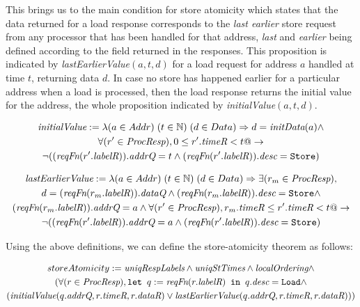This brings us to the main condition for store atomicity which states that the
data returned for a load response corresponds to the \emph{last earlier} store
request from any processor that has been handled for that address,
\emph{last} and \emph{earlier} being defined according to the field \timeR{}
returned in the responses.  This proposition is indicated by
\textit{lastEarlierValue}$(a, t, d)$ for a load request for address $a$ handled
at time $t$, returning data $d$.  In case no store has happened earlier for a
particular address when a load is processed, then the load response returns the
initial value for the address, the whole proposition indicated by
\textit{initialValue}$(a, t, d)$.
\begin{defn}
\small
\begin{multline*}
\textit{initialValue} := \lambda (a \in Addr)\; (t \in \mathbb{N}) \; (d \in Data)\Rightarrow
d = \textit{initData} (a) \wedge \\
\forall (r' \in \textit{ProcResp}), 0 \le r'.\textit{timeR} < t @->\\
\neg ((\textit{reqFn} (r'.\textit{labelR})).\textit{addrQ} = t \wedge (\textit{reqFn} (r'.\textit{labelR})).\textit{desc} = \texttt{Store})
\end{multline*}
\end{defn}

\begin{defn}
\small
\begin{multline*}
\textit{lastEarlierValue} := \lambda (a \in Addr)\; (t \in \mathbb{N}) \; (d \in Data)\Rightarrow
\exists (r_m \in \textit{ProcResp}),\\ d = (\textit{reqFn} (r_m.\textit{labelR})).\textit{dataQ} \wedge 
(\textit{reqFn} (r_m.\textit{labelR})).\textit{desc} = \texttt{Store} \wedge\\ (\textit{reqFn} (r_m.\textit{labelR})).\textit{addrQ} = a \wedge
\forall (r' \in \textit{ProcResp}), r_m.\textit{timeR} \le r'.\textit{timeR} < t @->\\
\neg ((\textit{reqFn} (r'.\textit{labelR})).\textit{addrQ} = a \wedge (\textit{reqFn} (r'.\textit{labelR})).\textit{desc} = \texttt{Store})
\end{multline*}
\end{defn}

Using the above definitions, we can define the store-atomicity theorem as follows:
\begin{thm}
\small
\begin{multline*}
storeAtomicity := 
\textit{uniqRespLabels} \wedge
\textit{uniqStTimes} \wedge \textit{localOrdering} \wedge \\
(\forall (r \in \textit{ProcResp}), \texttt{let } q := \textit{reqFn}(r.\textit{labelR}) \texttt{ in } q.\textit{desc} = \texttt{Load} \wedge \\
(\textit{initialValue}(q.\textit{addrQ}, r.\textit{timeR}, r.\textit{dataR}) \vee \textit{lastEarlierValue}(q.\textit{addrQ}, r.\textit{timeR}, r.\textit{dataR})))
\end{multline*}
\end{thm}
